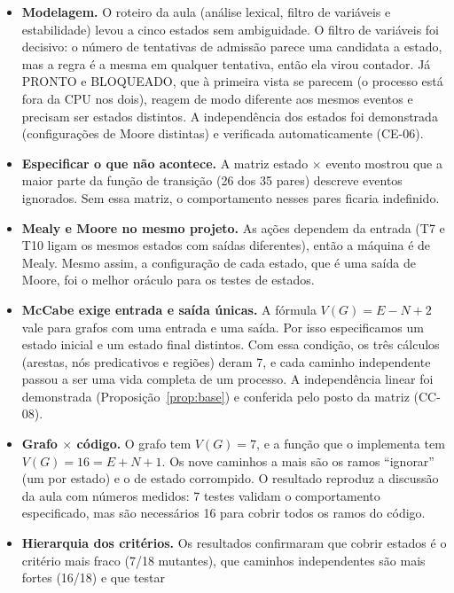 \documentclass[11pt,a4paper]{article}
\theoremstyle{definition}
\newcommand{\est}[1]{\textsf{\small #1}}   %
\newcommand{\VG}{V(G)}
\begin{document}
\begin{itemize}
  \item \textbf{Modelagem.} O roteiro da aula (análise lexical, filtro de variáveis e
        estabilidade) levou a cinco estados sem ambiguidade. O filtro de variáveis foi decisivo: o
        número de tentativas de admissão parece uma candidata a estado, mas a regra é a mesma em
        qualquer tentativa, então ela virou contador. Já \est{PRONTO} e \est{BLOQUEADO}, que à
        primeira vista se parecem (o processo está fora da CPU nos dois), reagem de modo diferente
        aos mesmos eventos e precisam ser estados distintos. A independência dos estados foi
        demonstrada (configurações de Moore distintas) e verificada automaticamente (CE-06).
  \item \textbf{Especificar o que não acontece.} A matriz estado $\times$ evento mostrou que a maior
        parte da função de transição (26 dos 35 pares) descreve eventos ignorados. Sem essa matriz, o
        comportamento nesses pares ficaria indefinido.
  \item \textbf{Mealy e Moore no mesmo projeto.} As ações dependem da entrada (T7 e T10 ligam os
        mesmos estados com saídas diferentes), então a máquina é de Mealy. Mesmo assim, a
        configuração de cada estado, que é uma saída de Moore, foi o melhor oráculo para os testes de
        estados.
  \item \textbf{McCabe exige entrada e saída únicas.} A fórmula $\VG = E - N + 2$ vale para grafos
        com uma entrada e uma saída. Por isso especificamos um estado inicial e um estado final
        distintos. Com essa condição, os três cálculos (arestas, nós predicativos e regiões) deram
        7, e cada caminho independente passou a ser uma vida completa de um processo. A
        independência linear foi demonstrada (Proposição~\ref{prop:base}) e conferida pelo posto da
        matriz (CC-08).
  \item \textbf{Grafo $\times$ código.} O grafo tem $\VG = 7$, e a função que o implementa tem
        $\VG = 16 = E + N + 1$. Os nove caminhos a mais são os ramos ``ignorar'' (um por estado) e o
        de estado corrompido. O resultado reproduz a discussão da aula com números medidos: 7 testes
        validam o comportamento especificado, mas são necessários 16 para cobrir todos os ramos do
        código.
  \item \textbf{Hierarquia dos critérios.} Os resultados confirmaram que cobrir estados é o critério
        mais fraco (7/18 mutantes), que caminhos independentes são mais fortes (16/18) e que testar

\end{itemize}
\end{document}
